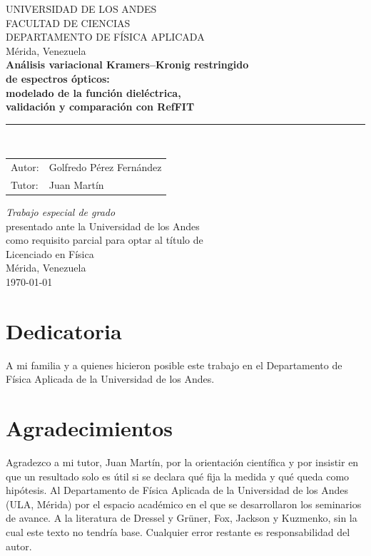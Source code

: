 \documentclass[a4paper,openright,12pt]{book}
\begin{document}
\begin{titlepage}
\begin{center}
\vspace*{0.2cm}
{\large UNIVERSIDAD DE LOS ANDES}\\[0.25cm]
{\large FACULTAD DE CIENCIAS}\\[0.2cm]
{\large DEPARTAMENTO DE F\'ISICA APLICADA}\\[0.15cm]
{\large M\'erida, Venezuela}\\[1.2cm]

{\LARGE\bfseries An\'alisis variacional Kramers--Kronig restringido\\[0.2cm]
de espectros \'opticos:\\[0.3cm]
modelado de la funci\'on diel\'ectrica,\\[0.12cm]
validaci\'on y comparaci\'on con RefFIT}\\[1.1cm]

\rule{70mm}{0.4pt}\\[0.9cm]

\begin{tabular}{ll}
Autor: & Golfredo P\'erez Fern\'andez \\[0.3cm]
Tutor: & Juan Mart\'in \\
\end{tabular}

\vspace{1.6cm}
\textit{Trabajo especial de grado}\\[0.25cm]
presentado ante la Universidad de los Andes\\[0.15cm]
como requisito parcial para optar al t\'itulo de\\[0.25cm]
{\large Licenciado en F\'isica}\\[1.0cm]
M\'erida, Venezuela\\[0.15cm]
\today
\end{center}
\end{titlepage}

\frontmatter

\chapter*{Dedicatoria}
A mi familia y a quienes hicieron posible este trabajo en el Departamento de F\'isica Aplicada de la Universidad de los Andes.

\chapter*{Agradecimientos}
Agradezco a mi tutor, Juan Mart\'in, por la orientaci\'on cient\'ifica y por insistir en que un resultado solo es \'util si se declara qu\'e fija la medida y qu\'e queda como hip\'otesis.
Al Departamento de F\'isica Aplicada de la Universidad de los Andes (ULA, M\'erida) por el espacio acad\'emico en el que se desarrollaron los seminarios de avance.
A la literatura de Dressel y Gr\"uner, Fox, Jackson y Kuzmenko, sin la cual este texto no tendr\'ia base.
Cualquier error restante es responsabilidad del autor.
\end{document}

